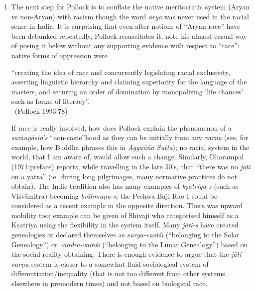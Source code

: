 {\begin{enumerate}
Without comparative data of Nazi sympathies in other disci\-plines, Pollock’s thesis on the role of German Indology in the holocaust is a house of cards; so too, his preposterous claim of Sanskrit ’s culpability. 

\item The next step for Pollock is to conflate the native meritocratic system (Aryan vs non-Aryan) with racism though the word {\sl ārya} was never used in the racial sense in India. It is surprising that even after notions of “Aryan race” have been debunked repeatedly, Pollock resuscitates it; note his almost casual way of posing it below without any supporting evidence with respect to “race”: native forms of oppression were 
\begin{myquote}
“creating the idea of race and concurrently legislating racial exclusivity, asserting linguistic hierarchy and claiming superiority for the language of the masters, and securing an order of domination by monopolizing ‘life chances’ such as forms of literacy”.\\[-15pt] 

~\hfill(Pollock 1993:78)
\end{myquote}

If race is really involved, how does Pollock explain the phenomenon of a {\sl saṁnyāsin's} “non-caste”hood as they can be initially from any {\sl varṇa} (see, for example, how Buddha phrases this in {\sl Aggañña Sutta}); no racial system in the world, that I am aware of, would allow such a change. Similarly, Dharampal (1971:preface) reports, while travelling in the late 50’s, that “there was no {\sl jati} on a yatra” (ie. during long pilgrimages, many normative practices do not obtain). The Indic tradition also has many examples of {\sl kṣatriya-s} (such as Viśvāmitra) becoming {\sl brāhmaṇa-s;} the Peshwa Baji Rao I could be considered as a recent example in the opposite direction. There was upward mobility too; example can be given of Shivaji who categorised himself as a Kṣatriya using the flexibility in the system itself. Many {\sl jāti-s} have created genealogies or declared themselves as {\sl sūrya-vaṁśī} (“belonging to the Solar Genealogy”) or {\sl candra-vaṁśī} (“belonging to the Lunar Genealogy”) based on the social reality obtaining. There is enough evidence to argue that the {\sl jāti-varṇa} system is closer to a somewhat fluid sociological system of differentiation/inequality (that is not too different from other systems elsewhere in premodern times) and not based on biological race. 


\end{enumerate}}
